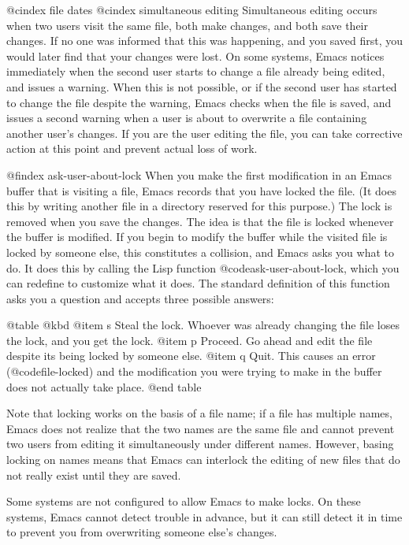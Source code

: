 {{{{{{{{{{{{{{{{{@cindex file dates
@cindex simultaneous editing
  Simultaneous editing occurs when two users visit the same file, both
make changes, and both save their changes.  If no one was informed that
this was happening, and you saved first, you would later find that your
changes were lost.  On some systems, Emacs notices immediately when the
second user starts to change a file already being edited, and issues a
warning.  When this is not possible, or if the second user has started
to change the file despite the warning, Emacs checks when the file is
saved, and issues a second warning when a user is about to overwrite a
file containing another user's changes.  If you are the user editing the
file, you can take corrective action at this point and prevent actual
loss of work.

@findex ask-user-about-lock
  When you make the first modification in an Emacs buffer that is visiting
a file, Emacs records that you have locked the file.  (It does this by
writing another file in a directory reserved for this purpose.)  The lock
is removed when you save the changes.  The idea is that the file is locked
whenever the buffer is modified.  If you begin to modify the buffer while
the visited file is locked by someone else, this constitutes a collision,
and Emacs asks you what to do.  It does this by calling the Lisp function
@code{ask-user-about-lock}, which you can redefine to customize what it
does.  The standard definition of this function asks you a
question and accepts three possible answers:

@table @kbd
@item s
Steal the lock.  Whoever was already changing the file loses the lock,
and you get the lock.
@item p
Proceed.  Go ahead and edit the file despite its being locked by someone else.
@item q
Quit.  This causes an error (@code{file-locked}) and the modification you
were trying to make in the buffer does not actually take place.
@end table

  Note that locking works on the basis of a file name; if a file has
multiple names, Emacs does not realize that the two names are the same file
and cannot prevent two users from editing it simultaneously under different
names.  However, basing locking on names means that Emacs can interlock the
editing of new files that do not really exist until they are saved.

  Some systems are not configured to allow Emacs to make locks.  On
these systems, Emacs cannot detect trouble in advance, but it can still
detect it in time to prevent you from overwriting someone else's changes.

}}}}}}}}}}}}}}}}}
